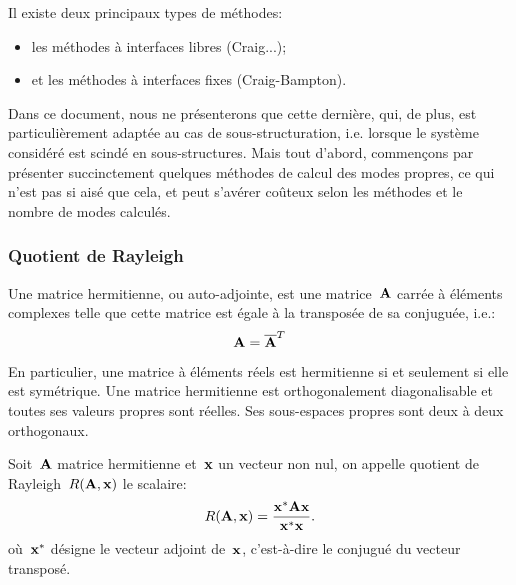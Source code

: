\medskip
Il existe deux principaux types de méthodes:
\begin{itemize}
  \item les méthodes à interfaces libres (Craig...);
  \item et les méthodes à interfaces fixes (Craig-Bampton).
\end{itemize}
Dans ce document, nous ne présenterons que cette dernière, qui, de plus,
est particulièrement adaptée au cas de sous-structuration, i.e. lorsque le système considéré est scindé en
sous-structures.
\medskipvm
Mais tout d'abord, commençons par présenter succinctement quelques méthodes de calcul des modes propres, ce qui n'est
pas si aisé que cela, et peut s'avérer coûteux selon les méthodes et le nombre de modes calculés.

\medskip
\subsubsection{Quotient de Rayleigh}

\begin{definition}
Une matrice hermitienne, ou auto-adjointe, est une matrice~$\MM{A}$ carrée à éléments complexes telle que
cette matrice est égale à la transposée de sa conjuguée, i.e.:
\begin{equation}
\MM{A} = \overline{\MM{A}}^T
\end{equation}
\end{definition}
En particulier, une matrice à éléments réels est hermitienne si et seulement si elle est symétrique.
\medskipvm
Une matrice hermitienne est orthogonalement diagonalisable et toutes ses valeurs propres sont
réelles. Ses sous-espaces propres sont deux à deux orthogonaux.

\begin{definition}
Soit~$\MM{A}$ matrice hermitienne et~$\VV{x}$ un vecteur non nul, on appelle quotient de Rayleigh~$R(\MM{A},\VV{x})$ le scalaire:
\begin{equation}
  R(\MM{A},\VV{x}) = \frac{\VV{x}^{*} \MM{A} \VV{x}}{\VV{x}^{*}\VV{x}}.
\end{equation}
où~$\VV{x}^{*}$ désigne le vecteur adjoint de~$\VV{x}$, c'est-à-dire le conjugué du vecteur transposé.
\end{definition}

